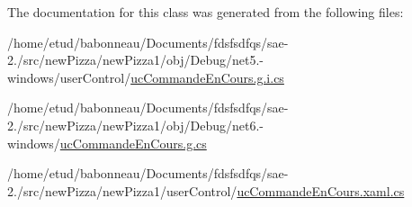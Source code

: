 The documentation for this class was generated from the following files\+:\begin{DoxyCompactItemize}
\item 
/home/etud/babonneau/\+Documents/fdsfsdfqs/sae-\/2./src/new\+Pizza/new\+Pizza1/obj/\+Debug/net5.-\/windows/user\+Control/\hyperlink{net5_80-windows_2userControl_2ucCommandeEnCours_8g_8i_8cs}{uc\+Commande\+En\+Cours.\+g.\+i.\+cs}\item 
/home/etud/babonneau/\+Documents/fdsfsdfqs/sae-\/2./src/new\+Pizza/new\+Pizza1/obj/\+Debug/net6.-\/windows/\hyperlink{Debug_2net6_80-windows_2ucCommandeEnCours_8g_8cs}{uc\+Commande\+En\+Cours.\+g.\+cs}\item 
/home/etud/babonneau/\+Documents/fdsfsdfqs/sae-\/2./src/new\+Pizza/new\+Pizza1/user\+Control/\hyperlink{ucCommandeEnCours_8xaml_8cs}{uc\+Commande\+En\+Cours.\+xaml.\+cs}\end{DoxyCompactItemize}
